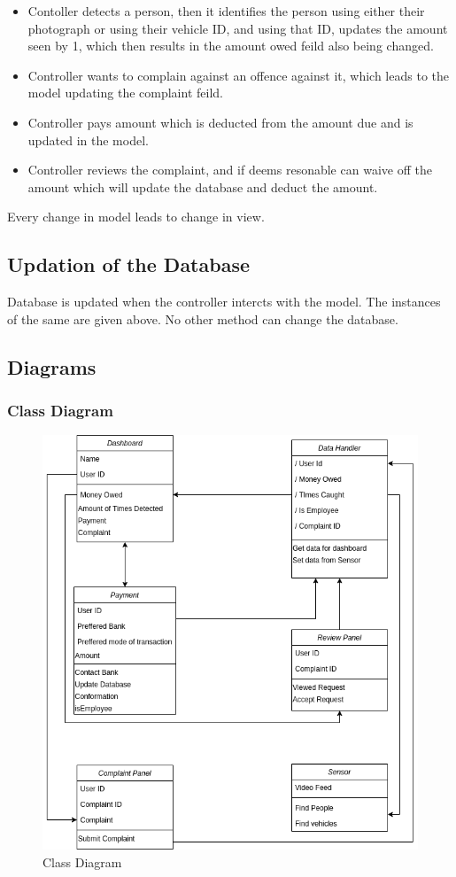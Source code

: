 \documentclass[10pt,twocolumn,letterpaper]{article}
\begin{document}
\begin{itemize}
    \item Contoller detects a person, then it identifies the person using either their 
    photograph or using their vehicle ID, and using that ID, updates the amount seen by 
    1, which then results in the amount owed feild also being changed.
    \item Controller wants to complain against an offence against it, which leads to the 
    model updating the complaint feild.
    \item Controller pays amount which is deducted from the amount due and is updated in 
    the model. 
    \item Controller reviews the complaint, and if deems resonable can waive off the 
    amount which will update the database and deduct the amount.
\end{itemize}

Every change in model leads to change in view.

\subsection*{Updation of the Database}
Database is updated when the controller intercts with the model. The instances 
of the same are given above. No other method can change the database.

\subsection*{Diagrams}
\subsubsection*{Class Diagram}
\begin{figure}[h]
    \centering
    \includegraphics[scale=0.3]{img/Class Diagram.png}    
    \caption{Class Diagram}
\end{figure}
\end{document}
